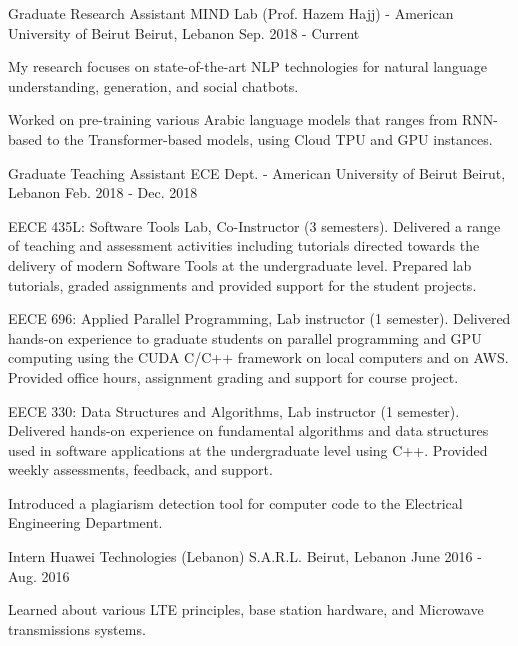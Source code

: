 \begin{cventries}
  \cventry
    {Graduate Research Assistant} %
    {MIND Lab (Prof. Hazem Hajj) - American University of Beirut} %
    {Beirut, Lebanon} %
    {Sep. 2018 - Current} %
    {
      \begin{cvitems} %
        \item {My research focuses on state-of-the-art NLP technologies for natural language understanding, generation, and social chatbots.}
        \item {Worked on pre-training various Arabic language models that ranges from RNN-based to the Transformer-based models, using Cloud TPU and GPU instances.}
      \end{cvitems}
    }

  \cventry
    {Graduate Teaching Assistant} %
    {ECE Dept. - American University of Beirut} %
    {Beirut, Lebanon} %
    {Feb. 2018 - Dec. 2018} %
    {
      \begin{cvitems} %
        \item {EECE 435L: Software Tools Lab, Co-Instructor (3 semesters).  Delivered a range of teaching and assessment activities including tutorials directed towards the delivery of modern Software Tools at the undergraduate level. Prepared lab tutorials, graded assignments and provided support for the student projects.}
        \item {EECE 696: Applied Parallel Programming, Lab instructor (1 semester). Delivered hands-on experience to graduate students on parallel programming and GPU computing using the CUDA C/C++ framework on local computers and on AWS. Provided office hours, assignment grading and support for course project.}
        \item {EECE 330: Data Structures and Algorithms, Lab instructor (1 semester). Delivered hands-on experience on fundamental algorithms and data structures used in software applications at the undergraduate level using C++. Provided weekly assessments, feedback, and support.}
        \item{Introduced a plagiarism detection tool for computer code to the Electrical Engineering Department.}
      \end{cvitems}
    }

  \cventry
    {Intern} %
    {Huawei Technologies (Lebanon) S.A.R.L.} %
    {Beirut, Lebanon} %
    {June 2016  - Aug. 2016} %
    {
      \begin{cvitems} %
        \item {Learned about various LTE principles, base station hardware, and Microwave transmissions systems.}
      \end{cvitems}
    }

\end{cventries}
